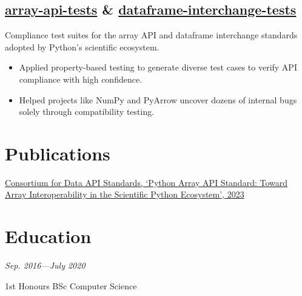 \documentclass[11pt]{article}
\newcommand{\datedsubsection}[2]{{\large\subsectionfont{#1}} \hfill {\scriptsize\textit{#2}}}
\newcommand{\listhighlights}[1]{
	\begin{itemize}[topsep=2pt, partopsep=0pt, itemsep=2pt, parsep=0pt, leftmargin=12pt]
		#1
	\end{itemize}
}
\begin{document}
\subsection*{\href{https://github.com/data-apis/array-api-tests/}{array-api-tests} \& \href{https://github.com/data-apis/dataframe-interchange-tests/}{dataframe-interchange-tests}}

Compliance test suites for the array API and dataframe interchange standards adopted by Python's scientific ecosystem.

\listhighlights{
	\item Applied property-based testing to generate diverse test cases to verify API compliance with high confidence.
	\item Helped projects like NumPy and PyArrow uncover dozens of internal bugs solely through compatibility testing.
}

\section*{Publications}

\href{https://proceedings.scipy.org/articles/gerudo-f2bc6f59-001}{Consortium for Data API Standards, `Python Array API Standard: Toward Array Interoperability in the Scientific Python Ecosystem', 2023}

\section*{Education}

\datedsubsection{Aston University}{Sep. 2016—July 2020}

1st Honours BSc Computer Science
\end{document}
